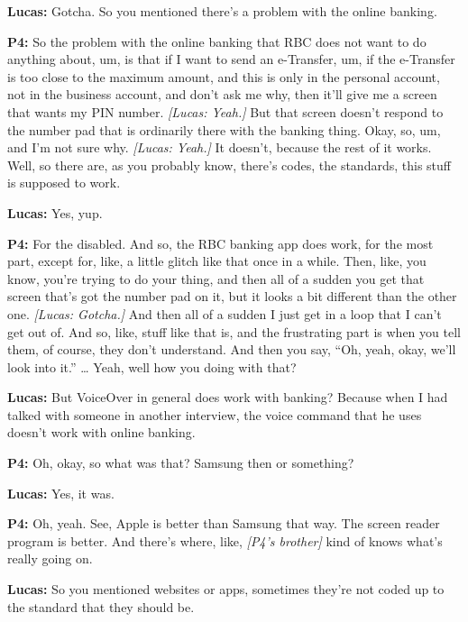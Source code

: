 \textbf{Lucas:} Gotcha. So you mentioned there's a problem with the online banking.

\textbf{P4:} So the problem with the online banking that RBC does not want to do anything about, um, is that if I want to send an e-Transfer, um, if the e-Transfer is too close to the maximum amount, and this is only in the personal account, not in the business account, and don't ask me why, then it'll give me a screen that wants my PIN number. \textit{[Lucas: Yeah.]} But that screen doesn't respond to the number pad that is ordinarily there with the banking thing. Okay, so, um, and I'm not sure why. \textit{[Lucas: Yeah.]} It doesn't, because the rest of it works. Well, so there are, as you probably know, there's codes, the standards, this stuff is supposed to work.

\textbf{Lucas:} Yes, yup.

\textbf{P4:} For the disabled. And so, the RBC banking app does work, for the most part, except for, like, a little glitch like that once in a while. Then, like, you know, you're trying to do your thing, and then all of a sudden you get that screen that's got the number pad on it, but it looks a bit different than the other one. \textit{[Lucas: Gotcha.]} And then all of a sudden I just get in a loop that I can't get out of. And so, like, stuff like that is, and the frustrating part is when you tell them, of course, they don't understand. And then you say, ``Oh, yeah, okay, we'll look into it.'' \ldots{} Yeah, well how you doing with that?

\textbf{Lucas:} But VoiceOver in general does work with banking? Because when I had talked with someone in another interview, the voice command that he uses doesn't work with online banking.

\textbf{P4:} Oh, okay, so what was that? Samsung then or something?

\textbf{Lucas:} Yes, it was.

\textbf{P4:} Oh, yeah. See, Apple is better than Samsung that way. The screen reader program is better. And there's where, like, \textit{[P4's brother]} kind of knows what's really going on.

\textbf{Lucas:} So you mentioned websites or apps, sometimes they're not coded up to the standard that they should be.

